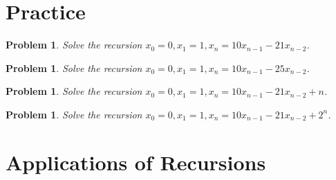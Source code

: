 \documentclass[11pt, openany]{book}
\theoremstyle{change} \theoremheaderfont{\blue\sffamily\bfseries}
\newtheorem{pro}[thm]{Problem}
\theoremstyle{nonumberplain} \theoremheaderfont{\sffamily\bfseries}
\newcommand{\í}{\'{\i}}
\begin{document}
\section*{Practice}
\begin{multicols}{2}\columnseprule 1pt \columnsep
25pt
\begin{pro}

Solve the recursion $x_0 = 0, x_1 = 1, x_n = 10x_{n - 1}  - 21x_{n
- 2}$.
\end{pro}
\begin{pro}

Solve the recursion $x_0 = 0, x_1 = 1, x_n = 10x_{n - 1}  - 25x_{n
- 2}$.
\end{pro}
\begin{pro}

Solve the recursion $x_0 = 0, x_1 = 1, x_n = 10x_{n - 1}  - 21x_{n
- 2} + n$.
\end{pro}
\begin{pro}

Solve the recursion $x_0 = 0, x_1 = 1, x_n = 10x_{n - 1}  - 21x_{n
- 2} + 2^n$.
\end{pro}
\end{multicols}




\section{Applications of Recursions}
\end{document}
